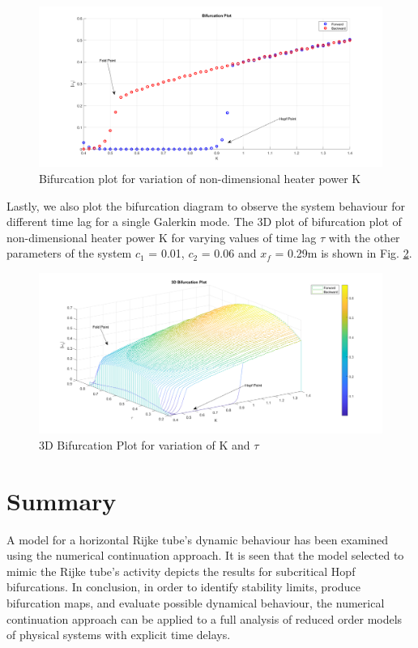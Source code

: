 \documentclass[8pt]{article} %
\begin{document}
\begin{figure}[H]
  \centering
    \includegraphics[width=0.9\linewidth]{bifur}
   \caption{Bifurcation plot for variation of non-dimensional heater power K}
    \label{fig:bifur}
\end{figure}
\noindent Lastly, we also plot the bifurcation diagram to observe the system behaviour for different time lag for a single Galerkin mode. The 3D plot of bifurcation plot of non-dimensional heater power K for varying values of time lag $\tau$ with the other parameters of the system $c_1$ = 0.01, $c_2$ = 0.06 and $x_f$ = 0.29m is shown in Fig. \ref{fig:3dbifur}.
\begin{figure}[H]
  \centering
    \includegraphics[width=1\linewidth]{bifur_3d}
   \caption{3D Bifurcation Plot for variation of K and $\tau$}
    \label{fig:3dbifur}
\end{figure}

\section{Summary}
A model for a horizontal Rijke tube's dynamic behaviour has been examined using the numerical continuation approach. It is seen that the model selected to mimic the Rijke tube's activity depicts the results for subcritical Hopf bifurcations. In conclusion, in order to identify stability limits, produce bifurcation maps, and evaluate possible dynamical behaviour, the numerical continuation approach can be applied to a full analysis of reduced order models of physical systems with explicit time delays.
\end{document}
